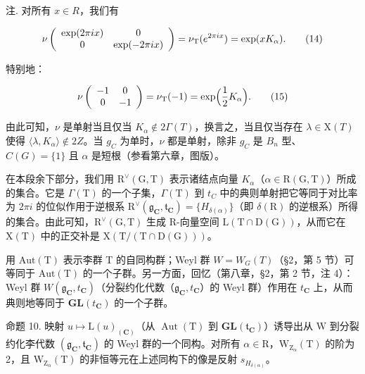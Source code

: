 注. 对所有 \(x \in R\)，我们有

\[
\nu \left( \begin{array}{c c} \exp (2 \pi i x) & 0 \\ 0 & \exp (- 2 \pi i x) \end{array} \right) = \nu_ {\mathrm{T}} (e ^ {2 \pi i x}) = \exp (x K _ {\alpha}).\tag{14}
\]

特别地：

\[
\nu \left( \begin{array}{c c} - 1 & 0 \\ 0 & - 1 \end{array} \right) = \nu_ {\mathrm{T}} (- 1) = \exp \Bigl (\frac {1}{2} K _ {\alpha} \Bigr).\tag{15}
\]

由此可知，\(\nu\) 是单射当且仅当 \(K_{\alpha} \notin 2\Gamma(T)\)，换言之，当且仅当存在 \(\lambda \in \mathrm{X}(T)\) 使得 \(\langle \lambda, K_{\alpha} \rangle \notin 2Z\)。当 \(g_{C}\) 为单时，\(\nu\) 都是单射，除非 \(g_{C}\) 是 \(B_{n}\) 型、\(C(G) = \{1\}\) 且 \(\alpha\) 是短根（参看第六章，图版）。

在本段余下部分，我们用 \(\mathrm{R}^{\vee}(\mathrm{G},\mathrm{T})\) 表示诸结点向量 \(K_{\alpha}\)（\(\alpha\in\mathrm{R}(\mathrm{G},\mathrm{T})\)）所成的集合。它是 \(\varGamma(\mathrm{T})\) 的一个子集，\(\varGamma(\mathrm{T})\) 到 \(t_{C}\) 中的典则单射把它等同于对比率为 \(2\pi i\) 的位似作用于逆根系 \(\mathrm{R}^{\vee}(\mathfrak{g}_{\mathbf{C}},\mathfrak{t}_{\mathbf{C}})=\{H_{\delta(\alpha)}\}\)（即 \(\delta(\mathrm{R})\) 的逆根系）所得的集合。由此可知，\(\mathrm{R}^{\vee}(\mathrm{G},\mathrm{T})\) 生成 R-向量空间 \(\mathrm{L}(\mathrm{T}\cap\mathrm{D}(\mathrm{G}))\)，从而它在 \(\mathrm{X}(\mathrm{T})\) 中的正交补是 \(\mathrm{X}(\mathrm{T}/(\mathrm{T}\cap\mathrm{D}(\mathrm{G})))\)。

用 \(\mathrm{Aut(T)}\) 表示李群 T 的自同构群；Weyl 群 \(W = W_{G}(T)\)（§2，第 5 节）可等同于 \(\mathrm{Aut(T)}\) 的一个子群。另一方面，回忆（第八章，§2，第 2 节，注 4）：Weyl 群 \(W(\mathfrak{g}_{\mathbf{C}}, t_{\mathbf{C}})\)（分裂约化代数（\(\mathfrak{g}_{\mathbf{C}}, t_{\mathbf{C}}\)）的 Weyl 群）作用在 \(t_{\mathbf{C}}\) 上，从而典则地等同于 \(\mathbf{GL}(t_{\mathbf{C}})\) 的一个子群。

命题 10. 映射 \(u \mapsto \mathrm{L}(u)_{(\mathbf{C})}\)（从 \(\operatorname{Aut}(\mathrm{T})\) 到 \(\mathbf{GL}(\mathfrak{t}_{\mathbf{C}})\)）诱导出从 \(\mathrm{W}\) 到分裂约化李代数 \((\mathfrak{g}_{\mathbf{C}}, \mathfrak{t}_{\mathbf{C}})\) 的 Weyl 群的一个同构。对所有 \(\alpha \in \mathrm{R}\)，\(\mathrm{W}_{\mathrm{Z}_{\alpha}}(\mathrm{T})\) 的阶为 2，且 \(\mathrm{W}_{\mathrm{Z}_{\alpha}}(\mathrm{T})\) 的非恒等元在上述同构下的像是反射 \(s_{H_{\delta(\alpha)}}\)。

